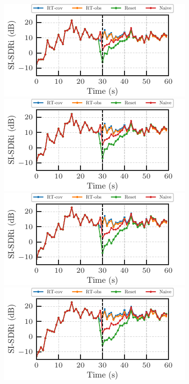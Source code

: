 \documentclass[sip,biber]{now-journal}
\begin{document}
\begin{figure}[t]
  \begin{minipage}[t]{.5\linewidth}
    \centering\includegraphics{figures/plots/online/Gauss_8000_fft4096_90.pdf}\label{fig:plot:gauss:90}
    \centering\includegraphics{figures/plots/online/Gauss_8000_fft4096_91.pdf}\label{fig:plot:gauss:91}
    \centering\includegraphics{figures/plots/online/Gauss_8000_fft4096_92.pdf}\label{fig:plot:gauss:92}
    \centering\includegraphics{figures/plots/online/Gauss_8000_fft4096_93.pdf}\label{fig:plot:gauss:93}

\end{minipage}
\end{figure}
\end{document}
